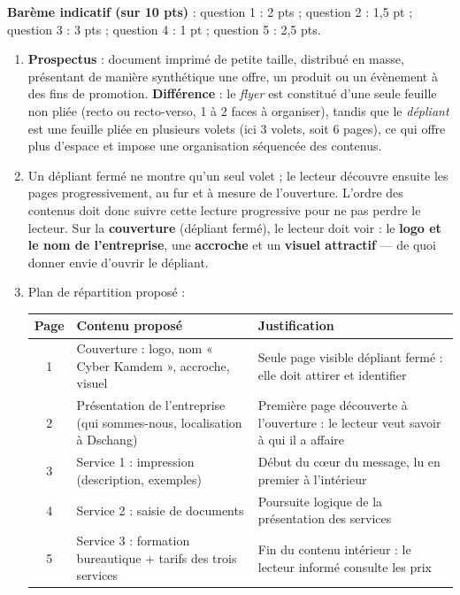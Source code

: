 \documentclass[11pt]{article}
\begin{document}
\begin{corrige}
\textbf{Barème indicatif (sur 10 pts)} : question 1 : 2 pts ; question 2 : 1,5 pt ; question 3 : 3 pts ; question 4 : 1 pt ; question 5 : 2,5 pts.

\begin{enumerate}
\item \textbf{Prospectus} : document imprimé de petite taille, distribué en masse, présentant de manière synthétique une offre, un produit ou un évènement à des fins de promotion. \textbf{Différence} : le \emph{flyer} est constitué d'une seule feuille non pliée (recto ou recto-verso, 1 à 2 faces à organiser), tandis que le \emph{dépliant} est une feuille pliée en plusieurs volets (ici 3 volets, soit 6 pages), ce qui offre plus d'espace et impose une organisation séquencée des contenus.
\item Un dépliant fermé ne montre qu'un seul volet ; le lecteur découvre ensuite les pages progressivement, au fur et à mesure de l'ouverture. L'ordre des contenus doit donc suivre cette lecture progressive pour ne pas perdre le lecteur. Sur la \textbf{couverture} (dépliant fermé), le lecteur doit voir : le \textbf{logo et le nom de l'entreprise}, une \textbf{accroche} et un \textbf{visuel attractif} — de quoi donner envie d'ouvrir le dépliant.
\item Plan de répartition proposé :
\begin{center}
\begin{tabularx}{\linewidth}{|c|X|X|}
\hline
\rowcolor{popblueL} \textbf{Page} & \textbf{Contenu proposé} & \textbf{Justification} \\
\hline
1 & Couverture : logo, nom « Cyber Kamdem », accroche, visuel & Seule page visible dépliant fermé : elle doit attirer et identifier \\
\hline
2 & Présentation de l'entreprise (qui sommes-nous, localisation à Dschang) & Première page découverte à l'ouverture : le lecteur veut savoir à qui il a affaire \\
\hline
3 & Service 1 : impression (description, exemples) & Début du cœur du message, lu en premier à l'intérieur \\
\hline
4 & Service 2 : saisie de documents & Poursuite logique de la présentation des services \\
\hline
5 & Service 3 : formation bureautique + tarifs des trois services & Fin du contenu intérieur : le lecteur informé consulte les prix \\

\end{tabularx}
\end{center}
\end{enumerate}
\end{corrige}
\end{document}
